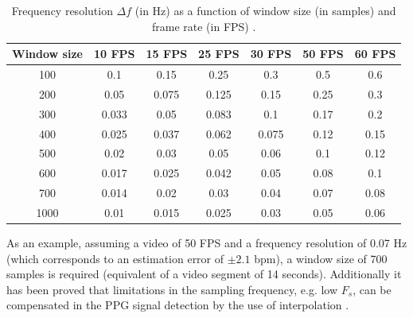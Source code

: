 \begin{table}[h!]
\caption{Frequency resolution $\Delta f$ (in Hz) as a function of window size (in samples) and frame rate (in FPS) \parencite{roald2013estimation}.}
\label{table:frequency-resolution}
\centering
\begin{tabular}{ccccccc}%
\toprule%
Window size & 10 FPS & 15 FPS & 25 FPS & 30 FPS & 50 FPS & 60 FPS \\
\midrule
100 & 0.1 & 0.15 & 0.25 & 0.3 & 0.5 & 0.6 \\
200 & 0.05 & 0.075 & 0.125 & 0.15 & 0.25 & 0.3 \\
300 & 0.033 & 0.05 & 0.083 & 0.1 & 0.17 & 0.2 \\
400 & 0.025 & 0.037 & 0.062 & 0.075 & 0.12 & 0.15 \\
500 & 0.02 & 0.03 & 0.05 & 0.06 & 0.1 & 0.12 \\
600 & 0.017 & 0.025 & 0.042 & 0.05 & 0.08 & 0.1 \\
700 & 0.014 & 0.02 & 0.03 & 0.04 & 0.07 & 0.08 \\
1000 & 0.01 & 0.015 & 0.025 & 0.03 & 0.05 & 0.06 \\
\bottomrule%
\end{tabular}%
\end{table}

As an example, assuming a video of 50 FPS and a frequency resolution of 0.07 Hz (which corresponds to an estimation error of $\pm 2.1$ bpm), a window size of 700 samples is required (equivalent of a video segment of 14 seconds). Additionally it has been proved that limitations in the sampling frequency, e.g. low $F_s$, can be compensated in the PPG signal detection by the use of interpolation \parencite{sun2012noncontact}.
